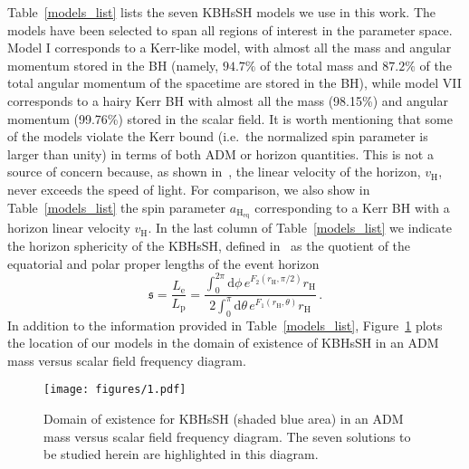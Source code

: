 \documentclass[twocolumn,aps,showpacs,showkeys,prd,superscriptaddress,byrevtex, amsmath]{revtex4-1}
\begin{document}
Table~\ref{models_list} lists the seven KBHsSH models we use in this work. The models have been selected to span all regions of interest in the parameter space. Model I corresponds to a Kerr-like model, with almost all the mass and angular momentum stored in the BH (namely, $94.7\%$ of the total mass and $87.2\%$ of the total angular momentum of the spacetime are stored in the BH), while model VII corresponds to a hairy Kerr BH with almost all the mass (98.15\%) and angular momentum (99.76\%) stored in the scalar field. It is worth mentioning that some of the models violate the Kerr bound (i.e.~the normalized spin parameter is larger than unity) in terms of both ADM or horizon quantities. This is not a source of concern because, as shown in~\cite{Herdeiro:2015c}, the linear velocity of the horizon, $v_{\mathrm{H}}$, never exceeds the speed of light. For comparison, we also show in Table~\ref{models_list} the spin parameter $a_{\mathrm{H_{eq}}}$ corresponding to a Kerr BH with a horizon linear velocity $v_{\mathrm{H}}$. In the last column of Table~\ref{models_list} we indicate the horizon sphericity of the KBHsSH, defined in~\cite{Delgado:2018} as the quotient of the equatorial and polar proper lengths of the event horizon
\begin{equation}
\mathfrak{s} = \frac{L_{\mathrm{e}}}{L_{\mathrm{p}}} = \frac{\int^{2\pi}_{0} \mathrm{d}\phi \, e^{F_2(r_{\mathrm{H}}, \pi/2)} r_{\mathrm{H}}}{2\int^{\pi}_{0} \mathrm{d} \theta \, e^{F_1(r_{\mathrm{H}}, \theta)} r_{\mathrm{H}}}\,.
\end{equation}
In addition to the information provided in Table~\ref{models_list}, Figure~\ref{existence} plots the location of our models in the domain of existence of KBHsSH in an ADM mass versus scalar field frequency diagram. 

\begin{figure}
\centering
\texttt{[image: figures/1.pdf]}
\caption{Domain of existence for KBHsSH (shaded blue area) in an ADM mass versus scalar
field frequency diagram. The seven solutions to be studied herein are highlighted in this diagram.}
\label{existence}
\end{figure}
\end{document}
